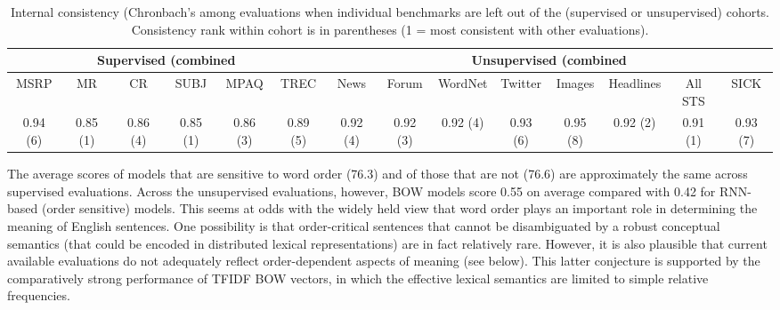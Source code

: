 \documentclass[11pt,letterpaper]{article}
\begin{document}
\hspace*{-2cm}
\begin{table*}[ht]
\begin{adjustwidth}{-1cm}{}
\renewcommand{\tabcolsep}{4.6pt}
\footnotesize
\begin{center}
      {
        \begin{tabular}{cccccc|cccccccc}
          \multicolumn{6}{c|}{Supervised (combined } & \multicolumn{8}{c}{Unsupervised (combined } \\
          \hline
                     MSRP & MR & CR & SUBJ & MPAQ & TREC & News & Forum & WordNet & Twitter & Images & Headlines & All STS  & SICK \\
                                          \footnotesize  0.94 (6) &	0.85 (1)	 &0.86 (4)	 &0.85 (1) &	0.86	(3) &0.89 (5) &	0.92	(4) &0.92 (3)	 &0.92 (4) &	0.93 (6)  &	0.95 (8)	 &0.92 (2)  &	0.91 (1)  &0.93 (7) \\
                                          \hline
        \end{tabular}
    }
    \caption{\label{consistency} Internal consistency (Chronbach's  among evaluations when individual benchmarks are left out of the (supervised or unsupervised) cohorts. Consistency rank within cohort is in parentheses (1 = most consistent with other evaluations).}
  \end{center}
  \vspace*{-4ex}
  \end{adjustwidth}
\end{table*}

  



\vspace{5pt} 
The average scores of models that are sensitive to word order (76.3) and of those that are not (76.6) are approximately the same across supervised evaluations. Across the unsupervised evaluations, however, BOW models score 0.55 on average compared with 0.42 for RNN-based (order sensitive) models. This seems at odds with the widely held view that word order plays an important role in determining the meaning of English sentences. One possibility is that order-critical sentences that cannot be disambiguated by a robust conceptual semantics (that could be encoded in distributed lexical representations) are in fact relatively rare. However, it is also plausible that current available evaluations do not adequately reflect order-dependent aspects of meaning (see below). This latter conjecture is supported by the comparatively strong performance of TFIDF BOW vectors, in which the effective lexical semantics are limited to simple relative frequencies.  
\end{document}
